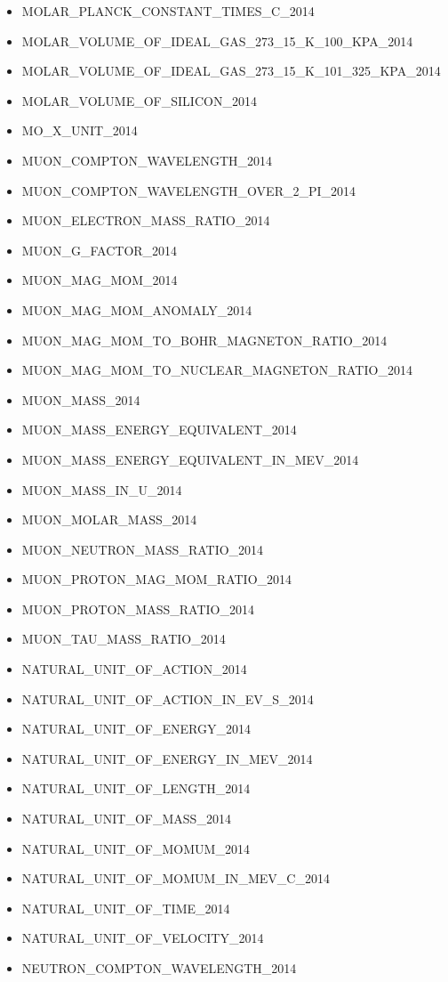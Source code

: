 \begin{itemize}
\item MOLAR\_PLANCK\_CONSTANT\_TIMES\_C\_2014
\item MOLAR\_VOLUME\_OF\_IDEAL\_GAS\_273\_15\_K\_100\_KPA\_2014
\item MOLAR\_VOLUME\_OF\_IDEAL\_GAS\_273\_15\_K\_101\_325\_KPA\_2014
\item MOLAR\_VOLUME\_OF\_SILICON\_2014
\item MO\_X\_UNIT\_2014
\item MUON\_COMPTON\_WAVELENGTH\_2014
\item MUON\_COMPTON\_WAVELENGTH\_OVER\_2\_PI\_2014
\item MUON\_ELECTRON\_MASS\_RATIO\_2014
\item MUON\_G\_FACTOR\_2014
\item MUON\_MAG\_MOM\_2014
\item MUON\_MAG\_MOM\_ANOMALY\_2014
\item MUON\_MAG\_MOM\_TO\_BOHR\_MAGNETON\_RATIO\_2014
\item MUON\_MAG\_MOM\_TO\_NUCLEAR\_MAGNETON\_RATIO\_2014
\item MUON\_MASS\_2014
\item MUON\_MASS\_ENERGY\_EQUIVALENT\_2014
\item MUON\_MASS\_ENERGY\_EQUIVALENT\_IN\_MEV\_2014
\item MUON\_MASS\_IN\_U\_2014
\item MUON\_MOLAR\_MASS\_2014
\item MUON\_NEUTRON\_MASS\_RATIO\_2014
\item MUON\_PROTON\_MAG\_MOM\_RATIO\_2014
\item MUON\_PROTON\_MASS\_RATIO\_2014
\item MUON\_TAU\_MASS\_RATIO\_2014
\item NATURAL\_UNIT\_OF\_ACTION\_2014
\item NATURAL\_UNIT\_OF\_ACTION\_IN\_EV\_S\_2014
\item NATURAL\_UNIT\_OF\_ENERGY\_2014
\item NATURAL\_UNIT\_OF\_ENERGY\_IN\_MEV\_2014
\item NATURAL\_UNIT\_OF\_LENGTH\_2014
\item NATURAL\_UNIT\_OF\_MASS\_2014
\item NATURAL\_UNIT\_OF\_MOMUM\_2014
\item NATURAL\_UNIT\_OF\_MOMUM\_IN\_MEV\_C\_2014
\item NATURAL\_UNIT\_OF\_TIME\_2014
\item NATURAL\_UNIT\_OF\_VELOCITY\_2014
\item NEUTRON\_COMPTON\_WAVELENGTH\_2014

\end{itemize}
